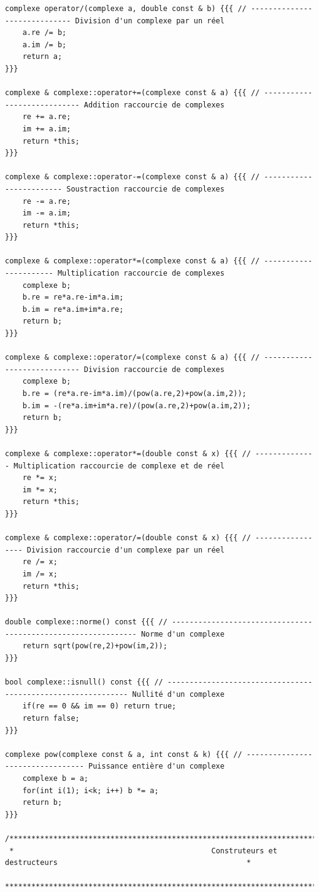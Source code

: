 \documentclass[a4paper]{article}
\begin{document}
\begin{verbatim}
complexe operator/(complexe a, double const & b) {{{ // ----------------------------- Division d'un complexe par un réel
    a.re /= b;
    a.im /= b;
    return a;
}}}

complexe & complexe::operator+=(complexe const & a) {{{ // ---------------------------- Addition raccourcie de complexes
    re += a.re;
    im += a.im;
    return *this;
}}}

complexe & complexe::operator-=(complexe const & a) {{{ // ------------------------ Soustraction raccourcie de complexes
    re -= a.re;
    im -= a.im;
    return *this;
}}}

complexe & complexe::operator*=(complexe const & a) {{{ // ---------------------- Multiplication raccourcie de complexes
    complexe b;
    b.re = re*a.re-im*a.im;
    b.im = re*a.im+im*a.re;
    return b;
}}}

complexe & complexe::operator/=(complexe const & a) {{{ // ---------------------------- Division raccourcie de complexes
    complexe b;
    b.re = (re*a.re-im*a.im)/(pow(a.re,2)+pow(a.im,2));
    b.im = -(re*a.im+im*a.re)/(pow(a.re,2)+pow(a.im,2));
    return b;
}}}

complexe & complexe::operator*=(double const & x) {{{ // -------------- Multiplication raccourcie de complexe et de réel
    re *= x;
    im *= x;
    return *this;
}}}

complexe & complexe::operator/=(double const & x) {{{ // ----------------- Division raccourcie d'un complexe par un réel
    re /= x;
    im /= x;
    return *this;
}}}

double complexe::norme() const {{{ // -------------------------------------------------------------- Norme d'un complexe
    return sqrt(pow(re,2)+pow(im,2));
}}}

bool complexe::isnull() const {{{ // ------------------------------------------------------------- Nullité d'un complexe
    if(re == 0 && im == 0) return true;
    return false;
}}}

complexe pow(complexe const & a, int const & k) {{{ // --------------------------------- Puissance entière d'un complexe
    complexe b = a;
    for(int i(1); i<k; i++) b *= a;
    return b;
}}}
        
/**********************************************************************************************************************
 *                                             Construteurs et destructeurs                                           *
 **********************************************************************************************************************/


\end{verbatim}
\end{document}
